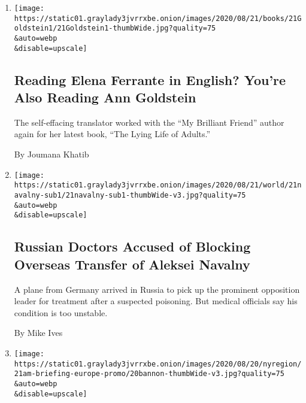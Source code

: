 \begin{enumerate}
\def\labelenumi{\arabic{enumi}.}
\item
  \href{/2020/08/21/books/elena-ferrante-lying-life-of-adults-ann-goldstein-translator.html}{}

  \texttt{[image: https://static01.graylady3jvrrxbe.onion/images/2020/08/21/books/21Goldstein1/21Goldstein1-thumbWide.jpg?quality=75\\\&auto=webp\\\&disable=upscale]}

  \hypertarget{reading-elena-ferrante-in-english-youre-also-reading-ann-goldstein}{%
  \subsection{Reading Elena Ferrante in English? You're Also Reading Ann
  Goldstein}\label{reading-elena-ferrante-in-english-youre-also-reading-ann-goldstein}}

  The self-effacing translator worked with the ``My Brilliant Friend''
  author again for her latest book, ``The Lying Life of Adults.''

  By Joumana Khatib
\item
  \href{/2020/08/21/world/europe/russia-navalny-poison-hospital.html}{}

  \texttt{[image: https://static01.graylady3jvrrxbe.onion/images/2020/08/21/world/21navalny-sub1/21navalny-sub1-thumbWide-v3.jpg?quality=75\\\&auto=webp\\\&disable=upscale]}

  \hypertarget{russian-doctors-accused-of-blocking-overseas-transfer-of-aleksei-navalny}{%
  \subsection{Russian Doctors Accused of Blocking Overseas Transfer of
  Aleksei
  Navalny}\label{russian-doctors-accused-of-blocking-overseas-transfer-of-aleksei-navalny}}

  A plane from Germany arrived in Russia to pick up the prominent
  opposition leader for treatment after a suspected poisoning. But
  medical officials say his condition is too unstable.

  By Mike Ives
\item
  \href{/2020/08/20/briefing/steve-bannon-aleksei-navalny-algorithm-bias.html}{}

  \texttt{[image: https://static01.graylady3jvrrxbe.onion/images/2020/08/20/nyregion/21am-briefing-europe-promo/20bannon-thumbWide-v3.jpg?quality=75\\\&auto=webp\\\&disable=upscale]}

  \hypertarget{steve-bannon-aleksei-navalny-algorithm-bias-your-friday-briefing}{%
}
\end{enumerate}

